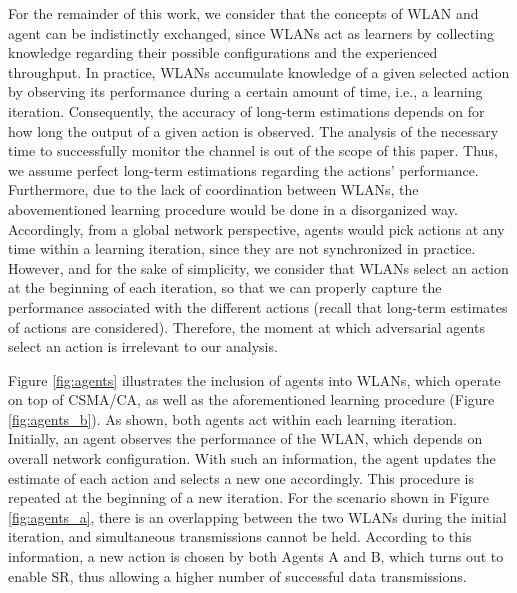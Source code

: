 \documentclass{article}
\begin{document}
For the remainder of this work, we consider that the concepts of WLAN and agent can be indistinctly exchanged, since WLANs act as learners by collecting knowledge regarding their possible configurations and the experienced throughput. In practice, WLANs accumulate knowledge of a given selected action by observing its performance during a certain amount of time, i.e., a learning iteration. Consequently, the accuracy of long-term estimations depends on for how long the output of a given action is observed. The analysis of the necessary time to successfully monitor the channel is out of the scope of this paper. Thus, we assume perfect long-term estimations regarding the actions' performance. Furthermore, due to the lack of coordination between WLANs, the abovementioned learning procedure would be done in a disorganized way. Accordingly, from a global network perspective, agents would pick actions at any time within a learning iteration, since they are not synchronized in practice. However, and for the sake of simplicity, we consider that WLANs select an action at the beginning of each iteration, so that we can properly capture the performance associated with the different actions (recall that long-term estimates of actions are considered). Therefore, the moment at which adversarial agents select an action is irrelevant to our analysis.

Figure \ref{fig:agents} illustrates the inclusion of agents into WLANs, which operate on top of CSMA/CA, as well as the aforementioned learning procedure (Figure \ref{fig:agents_b}). As shown, both agents act within each learning iteration. Initially, an agent observes the performance of the WLAN, which depends on overall network configuration. With such an information, the agent updates the estimate of each action and selects a new one accordingly. This procedure is repeated at the beginning of a new iteration. For the scenario shown in Figure \ref{fig:agents_a}, there is an overlapping between the two WLANs during the initial iteration, and simultaneous transmissions cannot be held. According to this information, a new action is chosen by both Agents A and B, which turns out to enable SR, thus allowing a higher number of successful data transmissions.
\end{document}
